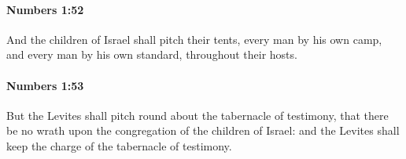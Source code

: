 		\paragraph{Numbers 1:52} %
			\label{NUMBERS-1-52}

			And the children of Israel shall pitch their tents, every man by his own camp, and every man by his own standard, throughout their hosts.


		\paragraph{Numbers 1:53} %
			\label{NUMBERS-1-53}

			But the Levites shall pitch round about the tabernacle of testimony, that there be no wrath upon the congregation of the children of Israel: and the Levites shall keep the charge of the tabernacle of testimony.


